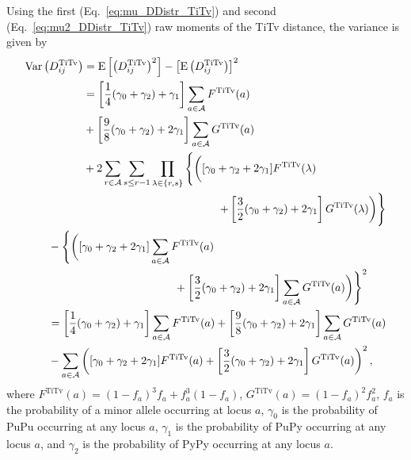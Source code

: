 \documentclass[aoas]{imsart}
\begin{document}
Using the first (Eq.~\ref{eq:mu_DDistr_TiTv}) and second (Eq.~\ref{eq:mu2_DDistr_TiTv}) raw moments of the TiTv distance, the variance is given by
%
\begin{equation}\label{eq:var_DDistr_TiTv}
\begin{split}
\begin{aligned}
\text{Var}\left(D^\text{TiTv}_{ij}\right) &= \text{E}\left[\left(D^\text{TiTv}_{ij}\right)^2\right] - \left[\text{E}\left(D^\text{TiTv}_{ij}\right)\right]^2 \\
&=\left[\frac{1}{4}(\gamma_0 + \gamma_2) + \gamma_1\right] \sum_{a \in \mathcal{A}} F^\text{TiTv}(a) \\
&+ \left[\frac{9}{8}(\gamma_0 + \gamma_2) + 2\gamma_1\right] \sum_{a \in \mathcal{A}} G^\text{TiTv}(a)\\
&+ 2 \sum_{r \in \mathcal{A}} \sum_{s \leq r - 1} \prod_{\lambda \in \{r,s\}} {\Biggl\{}{\biggl(}[\gamma_0 + \gamma_2 + 2\gamma_1] F^\text{TiTv}(\lambda)\hphantom{space space spa}
\end{aligned}\\
+ \left[\frac{3}{2}(\gamma_0 + \gamma_2) + 2\gamma_1\right] G^\text{TiTv}(\lambda){\biggr)}{\Biggr\}} \\
\begin{aligned}
&- {\Biggl\{}{\biggl(}[\gamma_0 + \gamma_2 + 2\gamma_1] \sum_{a \in \mathcal{A}} F^\text{TiTv}(a) \\
&\hspace{4cm}+ \left[\frac{3}{2}(\gamma_0 + \gamma_2) + 2\gamma_1\right] \sum_{a \in \mathcal{A}} G^\text{TiTv}(a){\biggr)}{\Biggr\}}^2 \\
&=\left[\frac{1}{4}(\gamma_0 + \gamma_2) + \gamma_1\right] \sum_{a \in \mathcal{A}} F^\text{TiTv}(a) + \left[\frac{9}{8}(\gamma_0 + \gamma_2) + 2\gamma_1\right] \sum_{a \in \mathcal{A}} G^\text{TiTv}(a) \\
&- \sum_{a \in \mathcal{A}} \left([\gamma_0 + \gamma_2 + 2\gamma_1] F^\text{TiTv}(a) + \left[\frac{3}{2}(\gamma_0 + \gamma_2) + 2\gamma_1\right] G^\text{TiTv}(a)\right)^2,
\end{aligned}
\end{split}
\end{equation}
%
where $F^\text{TiTv}(a) = (1 - f_a)^3 f_a + f^3_a (1 - f_a)$, $G^\text{TiTv}(a) = (1 - f_a)^2 f^2_a$, $f_a$ is the probability of a minor allele occurring at locus $a$, $\gamma_0$ is the probability of PuPu occurring at any locus $a$, $\gamma_1$ is the probability of PuPy occurring at any locus $a$, and $\gamma_2$ is the probability of PyPy occurring at any locus $a$.
\end{document}
